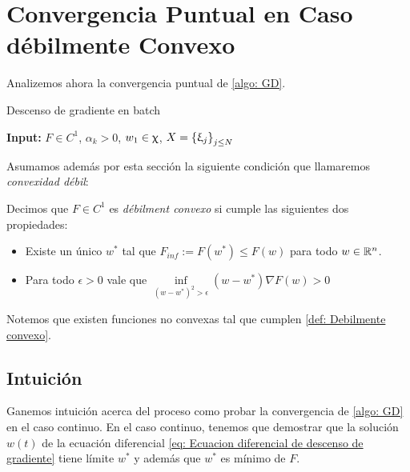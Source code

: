 \chapter{Convergencia Puntual en Caso d\'ebilmente Convexo }\label{ch:convergenciaPuntualDebilmenteConvexo}

Analizemos ahora la convergencia puntual de \ref{algo: GD}. 

\LinesNumbered
\begin{algorithm}[H]
	\caption{Descenso de gradiente en batch \label{algo: GD}}
	\textbf{Input:} $F \in C^1$, $\alpha_k >0$, $w_1 \in \upchi$, $X = \left\lbrace\upxi_j\right\rbrace_{j \leq N}$  \\
\end{algorithm}

Asumamos adem\'as por esta secci\'on la siguiente condici\'on que llamaremos \textit{convexidad d\'ebil}:

\begin{definition}
	\label{def: Debilmente convexo}
	Decimos que $F \in C^1$ es \textit{d\'ebilment convexo} si cumple las siguientes dos propiedades:
	
	\begin{itemize}
		\item Existe un \'unico $w^*$ tal que $F_{inf} := F(w^*) \leq F(w)$ para todo $w \in {\mathbb{R}}^n$.
		\item Para todo $\epsilon > 0$ vale que $\inf\limits_{(w-w^*)^2 > \epsilon} {\left(w - w^*\right) \nabla F(w) > 0}$
	\end{itemize}
	
\end{definition}

\begin{remark}
	Notemos que existen funciones no convexas tal que cumplen \ref{def: Debilmente convexo}.
\end{remark}

\section{Intuici\'on}\label{section: Intuicion convergencia puntual batch}

Ganemos intuici\'on acerca del proceso como probar la convergencia de \ref{algo: GD} en el caso continuo. En el caso continuo, tenemos que demostrar que la soluci\'on $w(t)$ de la ecuaci\'on diferencial \ref{eq: Ecuacion diferencial de descenso de gradiente} tiene l\'imite $w^*$ y adem\'as que $w^*$ es m\'inimo de $F$.

